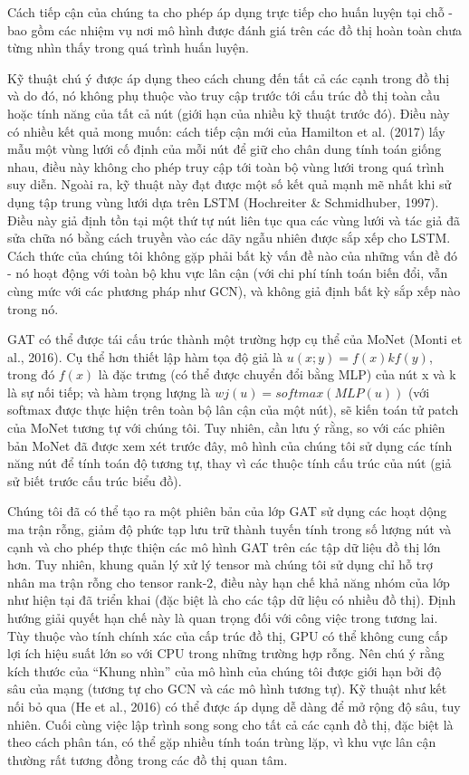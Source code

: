 Cách tiếp cận của chúng ta cho phép áp dụng trực tiếp cho huấn luyện tại chỗ - bao gồm các nhiệm vụ nơi mô hình được đánh giá trên các đồ thị hoàn toàn chưa từng nhìn thấy trong quá trình huấn luyện.

Kỹ thuật chú ý được áp dụng theo cách chung đến tất cả các cạnh trong đồ thị và do đó, nó không phụ thuộc vào truy cập trước tới cấu trúc đồ thị toàn cầu hoặc tính năng của tất cả nút (giới hạn của nhiều kỹ thuật trước đó). Điều này có nhiều kết quả mong muốn: cách tiếp cận mới của Hamilton et al. (2017) lấy mẫu một vùng lưới cố định của mỗi nút để giữ cho chân dung tính toán giống nhau, điều này không cho phép truy cập tới toàn bộ vùng lưới trong quá trình suy diễn. Ngoài ra, kỹ thuật này đạt được một số kết quả mạnh mẽ nhất khi sử dụng tập trung vùng lưới dựa trên LSTM (Hochreiter \& Schmidhuber, 1997). Điều này giả định tồn tại một thứ tự nút liên tục qua các vùng lưới và tác giả đã sửa chữa nó bằng cách truyền vào các dãy ngẫu nhiên được sắp xếp cho LSTM. Cách thức của chúng tôi không gặp phải bất kỳ vấn đề nào của những vấn đề đó - nó hoạt động với toàn bộ khu vực lân cận (với chi phí tính toán biến đổi, vẫn cùng mức với các phương pháp như GCN), và không giả định bất kỳ sắp xếp nào trong nó.

GAT có thể được tái cấu trúc thành một trường hợp cụ thể của MoNet (Monti et al., 2016). Cụ thể hơn thiết lập hàm tọa độ giả là $u(x;y) = f(x)kf(y)$, trong đó $f(x)$ là đặc trưng (có thể được chuyển đổi bằng MLP) của nút x và k là sự nối tiếp; và hàm trọng lượng là $wj(u) = softmax (MLP (u))$ (với softmax được thực hiện trên toàn bộ lân cận của một nút), sẽ kiến toán tử patch của MoNet tương tự với chúng tôi. Tuy nhiên, cần lưu ý rằng, so với các phiên bản MoNet đã được xem xét trước đây, mô hình của chúng tôi sử dụng các tính năng nút để tính toán độ tương tự, thay vì các thuộc tính cấu trúc của nút (giả sử biết trước cấu trúc biểu đồ).

Chúng tôi đã có thể tạo ra một phiên bản của lớp GAT sử dụng các hoạt dộng ma trận rỗng, giảm độ phức tạp lưu trữ thành tuyến tính trong số lượng nút và cạnh và cho phép thực thiện các mô hình GAT trên các tập dữ liệu đồ thị lớn hơn. Tuy nhiên, khung quản lý xử lý tensor mà chúng tôi sử dụng chỉ hỗ trợ nhân ma trận rỗng cho tensor rank-2, điều này hạn chế khả năng nhóm của lớp như hiện tại đã triển khai (đặc biệt là cho các tập dữ liệu có nhiều đồ thị). Định hướng giải quyết hạn chế này là quan trọng đối với công việc trong tương lai. Tùy thuộc vào tính chính xác của cấp trúc đồ thị, GPU có thể không cung cấp lợi ích hiệu suất lớn so với CPU trong những trường hợp rỗng. Nên chú ý rằng kích thước của “Khung nhìn” của mô hình của chúng tôi được giới hạn bởi độ sâu của mạng (tương tự cho GCN và các mô hình tương tự). Kỹ thuật như kết nối bỏ qua (He et al., 2016) có thể được áp dụng dễ dàng để mở rộng độ sâu, tuy nhiên. Cuối cùng việc lập trình song song cho tất cả các cạnh đồ thị, đặc biệt là theo cách phân tán, có thể gặp nhiều tính toán trùng lặp, vì khu vực lân cận thường rất tương đồng trong các đồ thị quan tâm.












